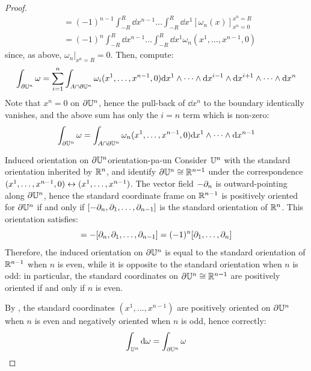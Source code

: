 \begin{proofbox}
\begin{proof}
\begin{equation*}
\begin{split}
        & = (-1)^{n-1} \int_{-R}^R \dd x^{n-1} \dots \int_{-R}^R \dd x^1 [\omega_n(x)]_{x^n = 0}^{x^n = R} \\
        & = (-1)^n \int_{-R}^R \dd x^{n-1} \dots \int_{-R}^R \dd x^1 \omega_n(x^1 , \dots , x^{n-1} , 0)
      \end{split}
    \end{equation*}
    since, as above, $ \omega_n \vert_{x^n = R} = 0 $. Then, compute:
    \begin{equation*}
      \int_{\partial \mathbb{U}^n} \omega = \sum_{i = 1}^n \int_{A \cap \partial \mathbb{U}^n} \omega_i(x^1 , \dots , x^{n-1} , 0) \mathrm{d} x^1 \wedge \dots \wedge \mathrm{d} x^{i-1} \wedge \mathrm{d} x^{i+1} \wedge \dots \wedge \mathrm{d} x^n
    \end{equation*}
    Note that $ x^n = 0 $ on $ \partial \mathbb{U}^n $, hence the pull-back of $ \dd x^n $ to the boundary identically vanishes, and the above sum has only the $ i = n $ term which is non-zero:
    \begin{equation*}
      \int_{\partial \mathbb{U}^n} \omega = \int_{A \cap \partial \mathbb{U}^n} \omega_n(x^1 , \dots , x^{n-1} , 0) \mathrm{d} x^1 \wedge \dots \wedge \mathrm{d} x^{n-1}
    \end{equation*}

    \begin{observation}{Induced orientation on $ \partial \mathbb{U}^n $}{orientation-pa-un}
      Consider $ \mathbb{U}^n $ with the standard orientation inherited by $ \mathbb{R}^n $, and identify $ \partial \mathbb{U}^n \cong \mathbb{R}^{n-1} $ under the correspondence $ (x^1 , \dots , x^{n-1} , 0) \leftrightarrow (x^1 , \dots , x^{n-1}) $. The vector field $ - \partial_n $ is outward-pointing along $ \partial \mathbb{U}^n $, hence the standard coordinate frame on $ \mathbb{R}^{n-1} $ is positively oriented for $ \partial \mathbb{U}^n $ if and only if $ [-\partial_n , \partial_1 , \dots , \partial_{n-1}] $ is the standard orientation of $ \mathbb{R}^n $. This orientation satisfies:
      \begin{equation*}
        [-\pa_n , \pa_1 , \dots , \pa_{n-1}] = - [\pa_n , \pa_1 , \dots , \pa_{n-1}] = (-1)^n [\pa_1 , \dots , \pa_n]
      \end{equation*}
      Therefore, the induced orientation on $ \partial \mathbb{U}^n $ is equal to the standard orientation of $ \mathbb{R}^{n-1} $ when $ n $ is even, while it is opposite to the standard orientation when $ n $ is odd: in particular, the standard coordinates on $ \partial \mathbb{U}^n \cong \mathbb{R}^{n-1} $ are positively oriented if and only if $ n $ is even.
    \end{observation}

    By , the standard coordinates $ (x^1 , \dots , x^{n-1}) $ are positively oriented on $ \partial \mathbb{U}^n $ when $ n $ is even and negatively oriented when $ n $ is odd, hence correctly:
    \begin{equation*}
      \int_{\mathbb{U}^n} \mathrm{d} \omega = \int_{\partial \mathbb{U}^n} \omega
    \end{equation*}


\end{proof}
\end{proofbox}
